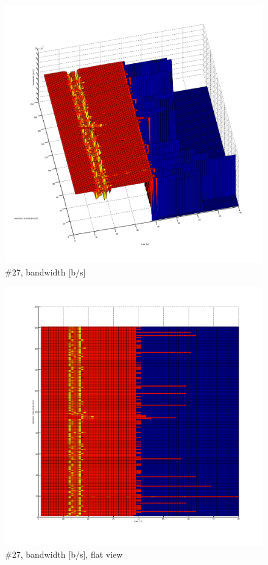 \begin{figure}[htb]
	\begin{center}
	\includegraphics[width=\textwidth]{results-279-3d.png}
	\end{center}
	\caption[]{\#27, bandwidth [b/s]}
	\label{img:results-279-3d.png}
\end{figure}
\begin{figure}[htb]
	\begin{center}
	\includegraphics[width=\textwidth]{results-279-2d.png}
	\end{center}
	\caption[]{\#27, bandwidth [b/s], flat view}
	\label{img:results-279-2d.png}
\end{figure}
\FloatBarrier


